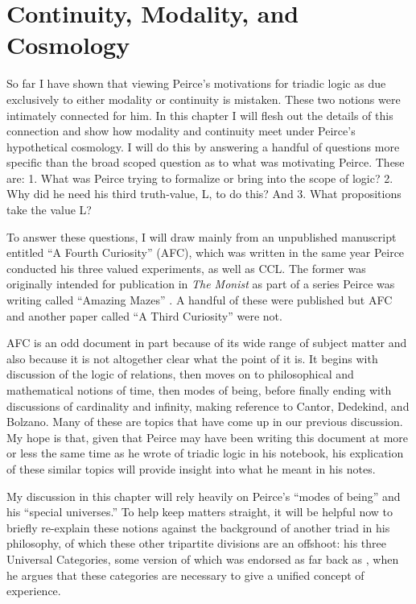 \chapter{Continuity, Modality, and Cosmology}

So far I have shown that viewing Peirce's motivations for triadic logic as due exclusively to either modality or continuity is mistaken. These two notions were intimately connected for him. In this chapter I will flesh out the details of this connection and show how modality and continuity meet under Peirce's hypothetical cosmology. I will do this by answering a handful of questions more specific than the broad scoped question as to what was motivating Peirce. These are: 1. What was Peirce trying to formalize or bring into the scope of logic? 2. Why did he need his third truth-value, L, to do this? And 3. What propositions take the value L? 

To answer these questions, I will draw mainly from an unpublished manuscript entitled ``A Fourth Curiosity'' (AFC), which was written in the same year Peirce conducted his three valued experiments, as well as CCL. The former was originally intended for publication in \textit{The Monist} as part of a series Peirce was writing called ``Amazing Mazes” \citep{peirce_amazing_1908}. A handful of these were published but AFC and another paper called ``A Third Curiosity'' were not.

AFC is an odd document in part because of its wide range of subject matter and also because it is not altogether clear what the point of it is. It begins with discussion of the logic of relations, then moves on to philosophical and mathematical notions of time, then modes of being, before finally ending with discussions of cardinality and infinity, making reference to Cantor, Dedekind, and Bolzano. Many of these are topics that have come up in our previous discussion. My hope is that, given that Peirce may have been writing this document at more or less the same time as he wrote of triadic logic in his notebook, his explication of these similar topics will provide insight into what he meant in his notes.

My discussion in this chapter will rely heavily on Peirce's ``modes of being'' and his ``special universes.'' To help keep matters straight, it will be helpful now to briefly re-explain these notions against the background of another triad in his philosophy, of which these other tripartite divisions are an offshoot: his three Universal Categories, some version of which was endorsed as far back as \citeyear{peirce_five_1865}, when he argues that these categories are necessary to give a unified concept of experience.

